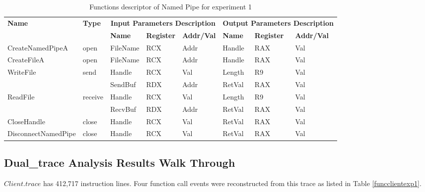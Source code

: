 \documentclass[12pt,oneside]{book}
\begin{document}
\begin{table}[H]
  \centering
  \caption{Functions descriptor of Named Pipe for experiment 1}
  \label{fdescexp1}
  \begin{tabular}{|l|l|l|l|l|l|l|l|}
\hline
             \multirow{2}{*}{{\textbf{Name}}} & \multirow{2}{*}{{\textbf{Type}}} & \multicolumn{3}{c|}{\textbf{Input Parameters Description}} & \multicolumn{3}{c|}{\textbf{Output Parameters Description}} \\
              \cline{3-8} 
             & & \textbf{Name}& \textbf{Register} & \textbf{Addr/Val} & \textbf{Name}& \textbf{Register} &  \textbf{Addr/Val}  \\
             \hline
      CreateNamedPipeA
       &open & FileName & RCX  & Addr &  Handle & RAX & Val\\
      \hline         
      CreateFileA
       &open & FileName & RCX & Addr&  Handle & RAX & Val\\ 
      \hline              
      \multirow{2}{*}{WriteFile}
       &\multirow{2}{*}{send} &  Handle & RCX & Val & Length& R9 &Val\\
        \cline{3-8} 
       & & SendBuf & RDX & Addr & RetVal& RAX & Val\\
      \hline            
      \multirow{2}{*}{ReadFile}
       &\multirow{2}{*}{receive} &  Handle & RCX & Val& Length &R9 & Val\\
        \cline{3-8} 
       & & RecvBuf & RDX  & Addr & RetVal& RAX & Val\\
      \hline            
      CloseHandle &
       close &  Handle & RCX & Val & RetVal& RAX & Val\\
      \hline            
      DisconnectNamedPipe &
      close &  Handle & RCX & Val & RetVal& RAX & Val\\
      \hline               
  \end{tabular}
\end{table}


\subsection{Dual\_trace Analysis Results Walk Through}
$Client.trace$ has 412,717 instruction lines. Four function call events were reconstructed from this trace as listed in Table \ref{funcclientexp1}.
\end{document}
